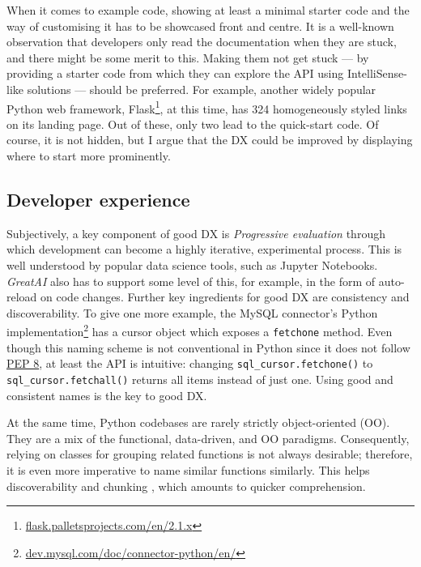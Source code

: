When it comes to example code, showing at least a minimal starter code and the way of customising it has to be showcased front and centre. It is a well-known observation that developers only read the documentation when they are stuck, and there might be some merit to this. Making them not get stuck --- by providing a starter code from which they can explore the API using IntelliSense-like solutions --- should be preferred. For example, another widely popular Python web framework, Flask\footnote{\href{https://flask.palletsprojects.com/en/2.1.x/}{flask.palletsprojects.com/en/2.1.x}}, at this time, has 324 homogeneously styled links on its landing page. Out of these, only two lead to the quick-start code. Of course, it is not hidden, but I argue that the DX could be improved by displaying where to start more prominently.

\subsection{Developer experience}

Subjectively, a key component of good DX is \textit{Progressive evaluation} through which development can become a highly iterative, experimental process. This is well understood by popular data science tools, such as Jupyter Notebooks. \textit{GreatAI} also has to support some level of this, for example, in the form of auto-reload on code changes. Further key ingredients for good DX are consistency and discoverability. To give one more example, the MySQL connector's Python implementation\footnote{\href{https://dev.mysql.com/doc/connector-python/en/}{dev.mysql.com/doc/connector-python/en/}} has a cursor object which exposes a \texttt{fetchone} method. Even though this naming scheme is not conventional in Python since it does not follow \href{https://peps.python.org/pep-0008/}{PEP 8}, at least the API is intuitive: changing \texttt{sql\_cursor.fetchone()} to \texttt{sql\_cursor.fetchall()} returns all items instead of just one. Using good and consistent names is the key to good DX.

At the same time, Python codebases are rarely strictly object-oriented (OO). They are a mix of the functional, data-driven, and OO paradigms. Consequently, relying on classes for grouping related functions is not always desirable; therefore, it is even more imperative to name similar functions similarly. This helps discoverability and chunking \cite{hermans2021programmer}, which amounts to quicker comprehension.


